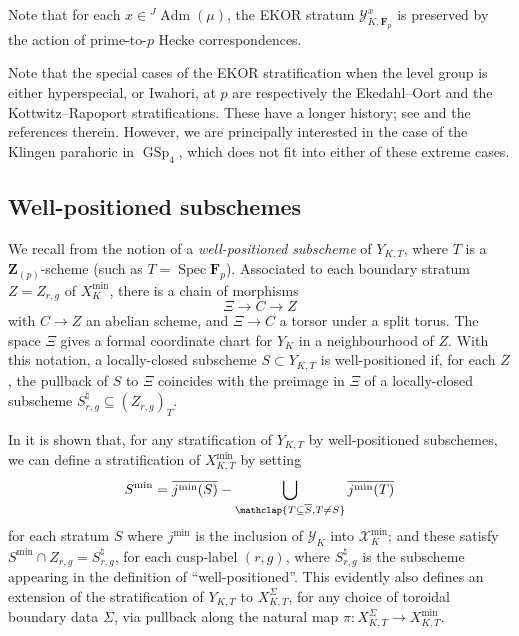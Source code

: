 \documentclass[cjm]{ipart}
\theoremstyle{plain}
\theoremstyle{remark}
\DeclareMathOperator{\GSp}{GSp}
\DeclareMathOperator{\Spec}{Spec}
\newcommand{\Fp}{\mathbf{F}_p}
\newcommand{\ZZ}{\mathbf{Z}}
\newcommand{\cX}{\mathcal{X}}
\newcommand{\cY}{\mathcal{Y}}
\numberwithin{equation}{subsection}
\begin{document}
  Note that for each $x \in {}^J\!\! \operatorname{Adm}(\mu)$, the EKOR stratum $\cY_{K, \Fp}^x$ is preserved by the action of prime-to-$p$ Hecke correspondences.

  \begin{remark}
   Note that the special cases of the EKOR stratification when the level group is either hyperspecial, or Iwahori, at $p$ are respectively the Ekedahl--Oort and the Kottwitz--Rapoport stratifications. These have a longer history; see \cite{herapoport17} and the references therein. However, we are principally interested in the case of the Klingen parahoric in $\GSp_4$, which does not fit into either of these extreme cases.
  \end{remark}

 \subsection{Well-positioned subschemes}

  We recall from \cite{lanstroh} the notion of a \emph{well-positioned subscheme} of $Y_{K, T}$, where $T$ is a $\ZZ_{(p)}$-scheme (such as $T = \Spec \mathbf{F}_p$). Associated to each boundary stratum $Z = Z_{r, g}$ of $X_K^{\min}$, there is a chain of morphisms
  \[ \Xi \to C \to Z\]
  with $C \to Z$ an abelian scheme, and $\Xi \to C$ a torsor under a split torus. The space $\Xi$ gives a formal coordinate chart for $Y_K$ in a neighbourhood of $Z$. With this notation, a locally-closed subscheme $S \subset Y_{K, T}$ is well-positioned if, for each $Z$, the pullback of $S$ to $\Xi$ coincides with the preimage in $\Xi$ of a locally-closed subscheme $S_{r, g}^\natural \subseteq (Z_{r, g})_T$.

  In \cite{lanstroh} it is shown that, for any stratification of $Y_{K, T}$ by well-positioned subschemes, we can define a stratification of $X_{K, T}^{\min}$ by setting
  \[ S^{\min} = \overline{j^{\min}(S)} - \bigcup_{\mathclap{T \subseteq \overline{S}, T \ne S}} \overline{j^{\min}(T)} \]
  for each stratum $S$ where $j^{\min}$ is the inclusion of $\cY_K$ into $\cX_K^{\min}$; and these satisfy $S^{\min} \cap Z_{r, g} = S_{r, g}^\natural$, for each cusp-label $(r, g)$, where $S_{r, g}^\natural$ is the subscheme appearing in the definition of ``well-positioned''. This evidently also defines an extension of the stratification of $Y_{K, T}$ to $X_{K, T}^\Sigma$, for any choice of toroidal boundary data $\Sigma$, via pullback along the natural map $\pi : X_{K, T}^\Sigma \to X_{K, T}^{\min}$.
\end{document}
